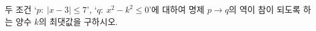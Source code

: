 두 조건 `$p:\ |x-3|\le 7$', `$q:\ x^2-k^2\le 0$'에 대하여 명제 $p\longrightarrow q$의 역이 참이 되도록 하는 양수 $k$의 최댓값을 구하시오.
